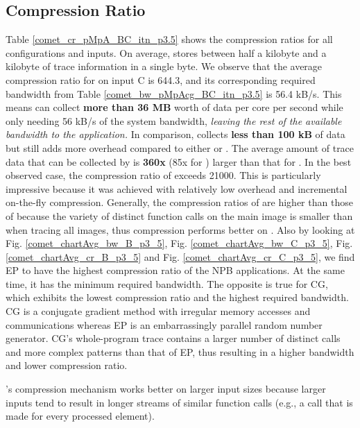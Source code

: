 \subsection{Compression Ratio}
\label{subsec:cr}
Table \ref{comet_cr_pMpA_BC_itn_p3.5} shows the compression ratios for all configurations and inputs.
%
On average, \parlot stores between half a kilobyte and a kilobyte of trace information in a single byte.
%
We observe that the
average compression ratio for \parlota on input C is 644.3, and its
corresponding required bandwidth from Table
\ref{comet_bw_pMpAcg_BC_itn_p3.5} is 56.4 kB/s.
%
This means \parlot can
collect \textbf{more than 36 MB} worth of data per core per second
while only needing 56 kB/s of the system bandwidth, {\em leaving the rest of the available bandwidth to the application.}
%
In comparison, \callgrind
collects \textbf{less than 100 kB} of data but still adds more
overhead compared to either \parlota or \parlotm .
%
The average amount of trace data that can be collected by \parlota is
\textbf{360x} (85x for \parlotm) larger than that for \callgrind.
%
In the best observed case, the compression ratio of
\parlot exceeds 21000.
%
This is particularly impressive because it was achieved with relatively low overhead and incremental
on-the-fly compression.
%
Generally, the compression ratios of \parlotm are higher than those of \parlota because the variety of distinct function calls on the main image is smaller than when tracing all images, thus compression performs better on \parlotm.
Also by looking at Fig. \ref{comet_chartAvg_bw_B_p3_5}, Fig. \ref{comet_chartAvg_bw_C_p3_5}, Fig. \ref{comet_chartAvg_cr_B_p3_5} and Fig. \ref{comet_chartAvg_cr_C_p3_5}, we find EP to have the highest compression ratio of the NPB applications. At the same time, it has the minimum required bandwidth. The opposite is true for CG, which exhibits the lowest compression ratio and the highest required bandwidth. CG is a conjugate gradient method with irregular memory accesses and communications whereas EP is an embarrassingly parallel random number generator. CG's whole-program trace contains a larger number of distinct calls and more complex patterns than that of EP, thus resulting in a higher bandwidth and lower compression ratio.
%

\parlot's compression mechanism works better on larger input sizes because larger inputs tend to result in longer streams of similar function calls (e.g., a call that is made for every processed element).



